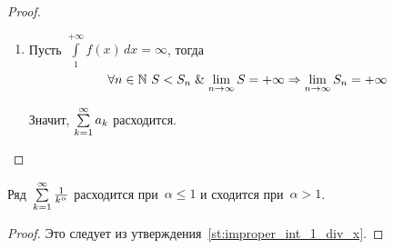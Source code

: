 \begin{proof}
\begin{enumerate}
\begin{minipage}[t]{68mm}
\begin{flushright}
	\end{flushright}
	\end{minipage}
	
	\item Пусть $\int\limits_1^{+\infty} f(x)\,dx = \infty$, тогда
	\begin{equation*}
	\forall n \in \mathbb N \ S < S_n \mathrel{\&}
	\lim\limits_{n \to \infty} S = +\infty \Rightarrow
	\lim\limits_{n \to \infty} S_n = +\infty
	\end{equation*}
	
	Значит, $\series a_k$ расходится.
\end{enumerate}
\end{proof}

\begin{consequent}
\label{conseq:series_1_div_k}
Ряд~$\series \frac1{k^\alpha}$ расходится при~$\alpha \leqslant 1$ и сходится при~$\alpha > 1$.
\end{consequent}
\begin{proof}
Это следует из утверждения~\ref{st:improper_int_1_div_x}.
\end{proof}
